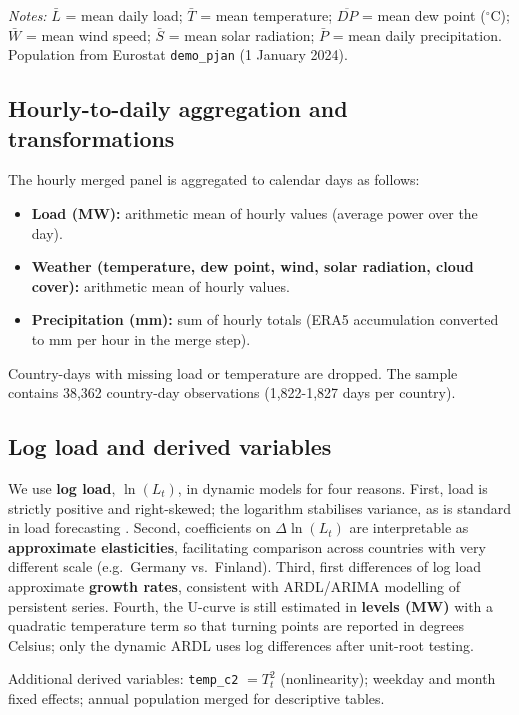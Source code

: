 \documentclass[12pt,a4paper]{article}
\begin{document}
\noindent\textit{Notes:} $\bar{L}$ = mean daily load; $\bar{T}$ = mean temperature; $\overline{DP}$ = mean dew point ($^\circ$C); $\bar{W}$ = mean wind speed; $\bar{S}$ = mean solar radiation; $\bar{P}$ = mean daily precipitation. Population from Eurostat \texttt{demo\_pjan} (1 January 2024).

\subsection{Hourly-to-daily aggregation and transformations}

The hourly merged panel is aggregated to calendar days as follows:
\begin{itemize}
  \item \textbf{Load (MW):} arithmetic mean of hourly values (average power over the day).
  \item \textbf{Weather (temperature, dew point, wind, solar radiation, cloud cover):} arithmetic mean of hourly values.
  \item \textbf{Precipitation (mm):} sum of hourly totals (ERA5 accumulation converted to mm per hour in the merge step).
\end{itemize}
Country-days with missing load or temperature are dropped. The sample contains 38,362 country-day observations (1,822-1,827 days per country).

\subsection{Log load and derived variables}

We use \textbf{log load}, $\ln(L_t)$, in dynamic models for four reasons. First, load is strictly positive and right-skewed; the logarithm stabilises variance, as is standard in load forecasting \citep{weron2014}. Second, coefficients on $\Delta\ln(L_t)$ are interpretable as \textbf{approximate elasticities}, facilitating comparison across countries with very different scale (e.g.\ Germany vs.\ Finland). Third, first differences of log load approximate \textbf{growth rates}, consistent with ARDL/ARIMA modelling of persistent series. Fourth, the U-curve is still estimated in \textbf{levels (MW)} with a quadratic temperature term so that turning points are reported in degrees Celsius; only the dynamic ARDL uses log differences after unit-root testing.

\noindent Additional derived variables: \texttt{temp\_c2} $= T_t^2$ (nonlinearity); weekday and month fixed effects; annual population merged for descriptive tables.
\end{document}
